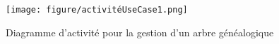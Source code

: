 %
%
%
%

\begin{figure}[H]
  \centering
  \texttt{[image: figure/activitéUseCase1.png]}
  \caption{Diagramme d'activité pour la gestion d'un arbre généalogique}
\end{figure}

